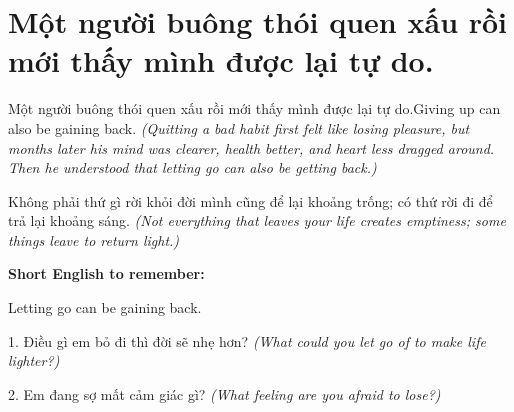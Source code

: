\section{Một người buông thói quen xấu rồi mới thấy mình được lại tự do.}
\begin{truyen}{Một người buông thói quen xấu rồi mới thấy mình được lại tự do.}{Giving up can also be gaining back.}
\textit{(Quitting a bad habit first felt like losing pleasure, but months later his mind was clearer, health better, and heart less dragged around. Then he understood that letting go can also be getting back.)}
\end{truyen}
\begin{baihoc}
Không phải thứ gì rời khỏi đời mình cũng để lại khoảng trống; có thứ rời đi để trả lại khoảng sáng.
\textit{(Not everything that leaves your life creates emptiness; some things leave to return light.)}
\end{baihoc}
\begin{ghinhoanh}\textbf{Short English to remember:}

Letting go can be gaining back.
\end{ghinhoanh}
\begin{tuhocnhanh}
1. Điều gì em bỏ đi thì đời sẽ nhẹ hơn? \textit{(What could you let go of to make life lighter?)}

2. Em đang sợ mất cảm giác gì? \textit{(What feeling are you afraid to lose?)}
\end{tuhocnhanh}
\ngancach

